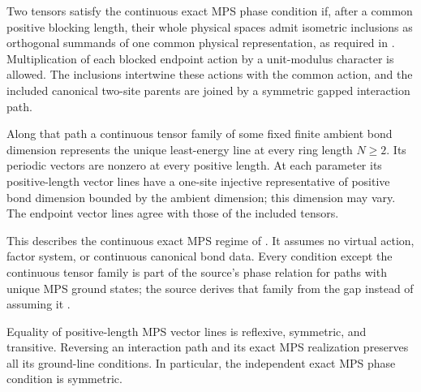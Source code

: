 \begin{definition}
    \label{def:spt_exact_mps_gapped_phase}
    \leanok
    Two tensors satisfy the continuous exact MPS phase condition if,
    after a common positive blocking length, their whole physical spaces
    admit isometric inclusions as orthogonal summands of one common physical
    representation, as required in \cite[Section~II.C.2]{Schuch2011Phases}.
    Multiplication of each blocked endpoint action by a unit-modulus
    character is allowed. The inclusions intertwine these actions with
    the common action, and the included canonical two-site parents are
    joined by a symmetric gapped interaction path.

    Along that path a continuous tensor family of some fixed finite
    ambient bond dimension represents the unique least-energy line at
    every ring length $N\ge2$. Its periodic vectors are nonzero at every
    positive length. At each parameter its positive-length vector lines
    have a one-site injective representative of positive bond dimension
    bounded by the ambient dimension; this dimension may vary.
    The endpoint vector lines agree with those of the included tensors.

    This describes the continuous exact MPS regime of
    \cite[Section~II.F.2]{Schuch2011Phases}. It assumes no virtual action,
    factor system, or continuous canonical bond data. Every condition except
    the continuous tensor family is part of the source's phase relation for
    paths with unique MPS ground states; the source derives that family from
    the gap instead of assuming it
    \cite{gap:spc11_spt_classification_continuous_realization}.
\end{definition}

\begin{lemma}
    \label{thm:spt_exact_mps_path_reversal}
    \leanok
    Equality of positive-length MPS vector lines is reflexive, symmetric,
    and transitive. Reversing an interaction path and its exact MPS
    realization preserves all its ground-line conditions. In particular,
    the independent exact MPS phase condition is symmetric.
\end{lemma}

